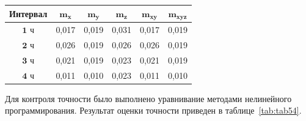 \begin{table} [htbp]
	\centering\small
	\begin{threeparttable}%
		\label{tab:tab53}
		\setlength{\tabcolsep}{5pt}
		
		\begin{tabular}{ c
				S[table-number-alignment = center]
				S[table-number-alignment = center]
				S[table-number-alignment = center]
				S[table-number-alignment = center]
				S[table-number-alignment = center] }
			
			\toprule
			\textbf{Интервал}	& $\mathbf{m_x}$& $\mathbf{m_y}$& $\mathbf{m_z}$& $\mathbf{m_{xy}}$	& $\mathbf{m_{xyz}}$	\\ \midrule%
			$\mathbf{1}$ ч		&  0,017		&  0,019		&  0,031		&	0,017			&	0,019		\\ %
			$\mathbf{2}$ ч		&  0,026		&  0,019		&  0,026		&	0,026			&	0,019		\\ %
			$\mathbf{3}$ ч		&  0,021 		&  0,019		&  0,023		&	0,021			&	0,019		\\ %
			$\mathbf{4}$ ч		&  0,011		&  0,010		&  0,023		&	0,011			&	0,010		\\ \bottomrule
		\end{tabular}
		
	\end{threeparttable}
\end{table}

  
Для контроля точности было выполнено уравнивание методами нелинейного программирования. Результат оценки точности приведен в таблице~\cref{tab:tab54}.


